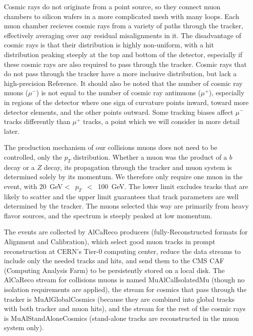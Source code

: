 \documentclass[12pt]{article}
\begin{document}
Cosmic rays do not originate from a point source, so they connect muon
chambers to silicon wafers in a more complicated mesh with many loops.
Each muon chamber recieves cosmic rays from a variety of paths through
the tracker, effectively averaging over any residual misalignments in
it.  The disadvantage of cosmic rays is that their distribution is
highly non-uniform, with a hit distribution peaking steeply at the top
and bottom of the detector, especially if these cosmic rays are also
required to pass through the tracker.  Cosmic rays that do not pass
through the tracker have a more inclusive distribution, but lack a
high-precision Reference.  It should also be noted that the number of
cosmic ray muons ($\mu^-$) is not equal to the number of cosmic ray
antimuons ($\mu^+$), especially in regions of the detector where one
sign of curvature points inward, toward more detector elements, and
the other points outward.  Some tracking biases affect $\mu^-$ tracks
differently than $\mu^+$ tracks, a point which we will consider in
more detail later.

The production mechanism of our collisions muons does not need to be
controlled, only the $p_T$ distribution.  Whether a muon was the
product of a $b$ decay or a $Z$ decay, its propagation through the
tracker and muon system is determined solely by its momentum.  We
therefore only require one muon in the event, with
20~GeV$<$~$p_T$~$<$~100~GeV.  The lower limit excludes tracks that are
likely to scatter and the upper limit guarantees that track parameters
are well determined by the tracker.  The muons selected this way are
primarily from heavy flavor sources, and the spectrum is steeply
peaked at low momentum.

The events are collected by AlCaReco producers (fully-Reconstructed
formats for Alignment and Calibration), which select good muon tracks
in prompt reconstruction at CERN's Tier-0 computing center, reduce the
data streams to include only the needed tracks and hits, and send them
to the CMS CAF (Computing Analysis Farm) to be persistently stored on
a local disk.  The AlCaReco stream for collisions muons is named
MuAlCalIsolatedMu (though no isolation requirements are applied), the
stream for cosmics that pass through the tracker is MuAlGlobalCosmics
(because they are combined into global tracks with both tracker and
muon hits), and the stream for the rest of the cosmic rays is
MuAlStandAloneCosmics (stand-alone tracks are reconstructed in the
muon system only)\label{page:AlCaReco}.
\end{document}
